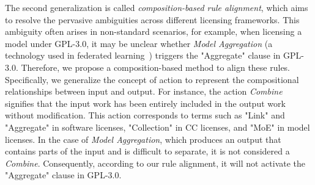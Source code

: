The second generalization is called \emph{composition-based rule alignment}, which aims to resolve the pervasive ambiguities across different licensing frameworks. 
This ambiguity often arises in non-standard scenarios, for example, when licensing a model under GPL-3.0, it may be unclear whether \emph{Model Aggregation} (a technology used in federated learning~\cite{li2021model}) triggers the "Aggregate" clause in GPL-3.0.
Therefore, we propose a composition-based method to align these rules. 
Specifically, we generalize the concept of action to represent the compositional relationships between input and output. 
For instance, the action \emph{Combine} signifies that the input work has been entirely included in the output work without modification. 
This action corresponds to terms such as "Link" and "Aggregate" in software licenses, "Collection" in CC licenses, and "MoE" in model licenses.
In the case of \emph{Model Aggregation}, which produces an output that contains parts of the input and is difficult to separate, it is not considered a \emph{Combine}. Consequently, according to our rule alignment, it will not activate the "Aggregate" clause in GPL-3.0.





